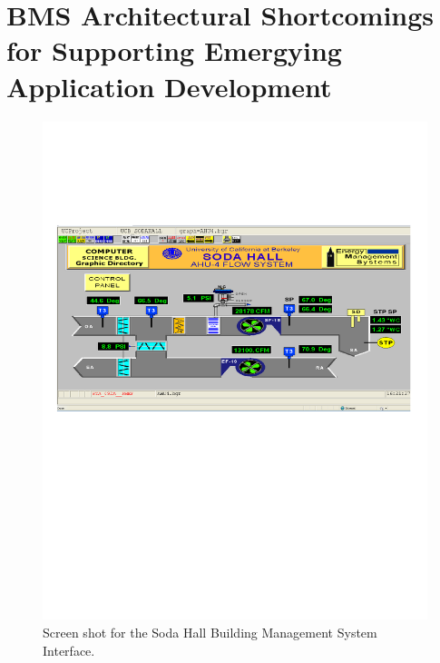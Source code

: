 \section{BMS Architectural Shortcomings for Supporting Emergying Application Development}

\begin{figure}[t!] %
\centering
\includegraphics[width=0.75\columnwidth]{figs/soda_bms_screenshot}
\caption{Screen shot for the Soda Hall Building Management System Interface.}
\label{fig:soda_bms_screenshot}
\end{figure}


